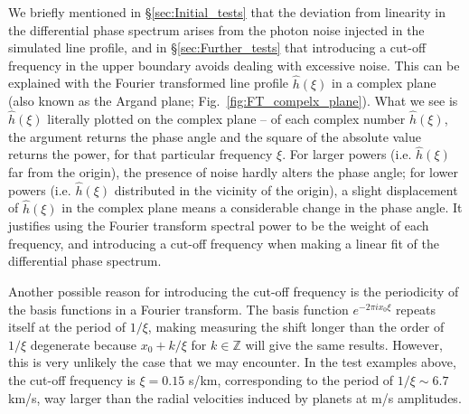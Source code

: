 We briefly mentioned in \S\ref{sec:Initial_tests} that the deviation from linearity in the differential phase spectrum arises from the photon noise injected in the simulated line profile, and in \S\ref{sec:Further_tests} that introducing a cut-off frequency in the upper boundary avoids dealing with excessive noise. This can be explained with the Fourier transformed line profile $\hat{h}(\xi)$ in a complex plane (also known as the Argand plane; Fig.~\ref{fig:FT_compelx_plane}). What we see is $\hat{h}(\xi)$ literally plotted on the complex plane -- of each complex number $\hat{h}(\xi)$, the argument returns the phase angle and the square of the absolute value returns the power, for that particular frequency $\xi$. For larger powers (i.e. $\hat{h}(\xi)$ far from the origin), the presence of noise hardly alters the phase angle; for lower powers (i.e. $\hat{h}(\xi)$ distributed in the vicinity of the origin), a slight displacement of $\hat{h}(\xi)$ in the complex plane means a considerable change in the phase angle. It justifies using the Fourier transform spectral power to be the weight of each frequency, and introducing a cut-off frequency when making a linear fit of the differential phase spectrum. 

Another possible reason for introducing the cut-off frequency is the periodicity of the basis functions in a Fourier transform. The basis function $e^{-2 \pi ix_0 \xi}$ repeats itself at the period of $1/\xi$, making measuring the shift longer than the order of $1/\xi$ degenerate because $x_0+k/\xi$ for $k\in\mathbb{Z}$ will give the same results. However, this is very unlikely the case that we may encounter. In the test examples above, the cut-off frequency is $\xi = 0.15$ s/km, corresponding to the period of $1/\xi\sim6.7$ km/s, way larger than the radial velocities induced by planets at m/s amplitudes. 


